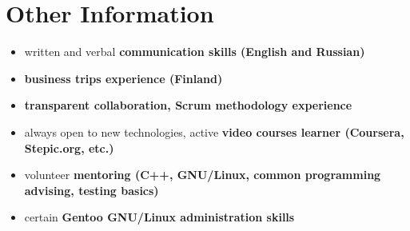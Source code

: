 \section*{Other Information}
\begin{itemize}
    \item written and verbal \bfseries communication skills \mdseries (English and Russian)
    \item \bfseries business trips \mdseries experience (Finland)
    \item \bfseries transparent \mdseries collaboration, \bfseries Scrum \mdseries methodology experience
    \item always open to new technologies, active \bfseries video courses \mdseries learner (Coursera, Stepic.org, etc.)
    \item volunteer \bfseries mentoring \mdseries (C++, GNU/Linux, common programming advising, testing basics)
    \item certain \bfseries Gentoo \mdseries GNU/Linux administration skills
\end{itemize}

